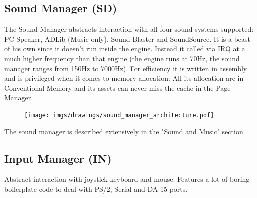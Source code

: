 \documentclass[book.tex]{subfiles}
\begin{document}
\subsection{Sound Manager (SD)}
The Sound Manager abstracts interaction with all four sound systems supported: PC Speaker, ADLib (Music only), Sound Blaster and SoundSource. It is a beast of his own since it doesn't run inside the engine. Instead it called via IRQ at a much higher frequency than that engine (the engine runs at 70Hz, the sound manager ranges from 150Hz to 7000Hz). For efficiency it is written in assembly and is privileged when it comes to memory allocation: All its allocation are in Conventional Memory and its assets can never miss the cache in the Page Manager.\\
 \par
\begin{figure}[H]
\centering
 \texttt{[image: imgs/drawings/sound\_manager\_architecture.pdf]}
 \end{figure}
 \par
The sound manager is described extensively in the "Sound and Music" section.

















\subsection{Input Manager (IN)}
Abstract interaction with joystick keyboard and mouse. Features a lot of boring boilerplate code to deal with PS/2, Serial and DA-15 ports.
\end{document}
